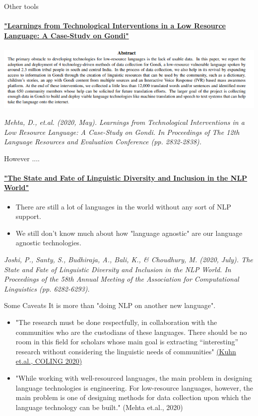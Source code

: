 \documentclass{beamer}
\begin{document}
\begin{frame}{Other tools}
\framesubtitle{\href{https://www.aclweb.org/anthology/2020.lrec-1.345/}{"Learnings from Technological Interventions in a Low Resource Language: A Case-Study on Gondi"}}

\includegraphics[width=\textwidth]{figures/gondi.PNG}
    
    \textit{Mehta, D., et.al. (2020, May). Learnings from Technological Interventions in a Low Resource Language: A Case-Study on Gondi. In Proceedings of The 12th Language Resources and Evaluation Conference (pp. 2832-2838).}
\end{frame}

\begin{frame}{However ....}
\framesubtitle{\href{https://www.aclweb.org/anthology/2020.acl-main.560/}{"The State and Fate of Linguistic Diversity and Inclusion in the NLP World"}}
    \begin{itemize}
        \item There are still a lot of languages in the world without any sort of NLP support.
        \item We still don't know much about how "language agnostic" are our language agnostic technologies. 
    \end{itemize}
    
\textit{Joshi, P., Santy, S., Budhiraja, A., Bali, K., \& Choudhury, M. (2020, July). The State and Fate of Linguistic Diversity and Inclusion in the NLP World. In Proceedings of the 58th Annual Meeting of the Association for Computational Linguistics (pp. 6282-6293).}
\end{frame}

\begin{frame}{Some Caveats}
It is more than "doing NLP on another new language".
    \begin{itemize}
            \item "The research must be done respectfully, in collaboration with the communities who
are the custodians of these languages. There should be no room in this field for scholars whose main goal is extracting “interesting” research without considering the linguistic needs of communities" \href{https://www.aclweb.org/anthology/2020.coling-main.516.pdf}{(Kuhn et.al., COLING 2020)}
        \item "While working with well-resourced languages, the main problem in designing language technologies is engineering. For low-resource languages, however, the main problem is one of designing methods for data collection upon which the language technology can be built." (Mehta et.al., 2020) \pause
    \end{itemize}
\end{frame}
\end{document}
